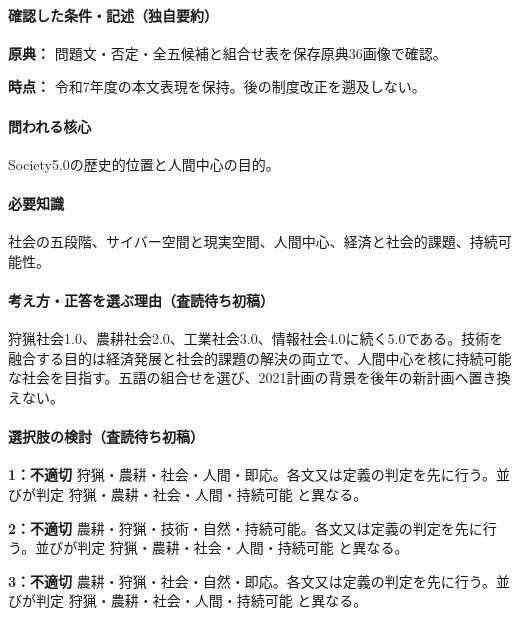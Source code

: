 \paragraph{確認した条件・記述（独自要約）}\mbox{}\par

\noindent\textbf{原典：} 問題文・否定・全五候補と組合せ表を保存原典36画像で確認。\par

\noindent\textbf{時点：} 令和7年度の本文表現を保持。後の制度改正を遡及しない。\par

\paragraph{問われる核心} Society5.0の歴史的位置と人間中心の目的。

\paragraph{必要知識} 社会の五段階、サイバー空間と現実空間、人間中心、経済と社会的課題、持続可能性。

\paragraph{考え方・正答を選ぶ理由（査読待ち初稿）} 狩猟社会1.0、農耕社会2.0、工業社会3.0、情報社会4.0に続く5.0である。技術を融合する目的は経済発展と社会的課題の解決の両立で、人間中心を核に持続可能な社会を目指す。五語の組合せを選び、2021計画の背景を後年の新計画へ置き換えない。

\paragraph{選択肢の検討（査読待ち初稿）}\mbox{}\par

\noindent\textbf{1：不適切} 狩猟・農耕・社会・人間・即応。各文又は定義の判定を先に行う。並びが判定 狩猟・農耕・社会・人間・持続可能 と異なる。\par

\noindent\textbf{2：不適切} 農耕・狩猟・技術・自然・持続可能。各文又は定義の判定を先に行う。並びが判定 狩猟・農耕・社会・人間・持続可能 と異なる。\par

\noindent\textbf{3：不適切} 農耕・狩猟・社会・自然・即応。各文又は定義の判定を先に行う。並びが判定 狩猟・農耕・社会・人間・持続可能 と異なる。\par

